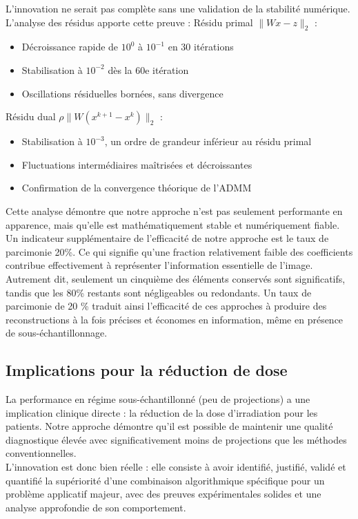 L'innovation ne serait pas complète sans une validation de la stabilité numérique. L'analyse des résidus apporte cette preuve :
Résidu primal $\|Wx - z\|_2$ :
\begin{itemize}[label=-]
\item Décroissance rapide de $10^0$ à $10^{-1}$ en 30 itérations
\item Stabilisation à $10^{-2}$ dès la 60e itération
\item Oscillations résiduelles bornées, sans divergence
\end{itemize}

Résidu dual $\rho \|W(x^{k+1} - x^k)\|_2$ :
\begin{itemize}[label=-]
\item Stabilisation à $10^{-3}$, un ordre de grandeur inférieur au résidu primal
\item Fluctuations intermédiaires maîtrisées et décroissantes
\item Confirmation de la convergence théorique de l'ADMM
\end{itemize}
Cette analyse démontre que notre approche n'est pas seulement performante en apparence, mais qu'elle est mathématiquement stable et numériquement fiable.\\
Un indicateur supplémentaire de l'efficacité de notre approche est le taux de parcimonie 20\%. Ce qui signifie qu'une fraction relativement faible des coefficients contribue effectivement à représenter l'information essentielle de l'image. Autrement dit, seulement un cinquième des éléments conservés sont significatifs, tandis que les 80\% restants sont négligeables ou redondants.
Un taux de parcimonie de 20 \% traduit ainsi l'efficacité de ces approches à produire des reconstructions à la fois précises et économes en information, même en présence de sous-échantillonnage.

\subsection{Implications pour la réduction de dose}
La performance en régime sous-échantillonné (peu de projections) a une implication clinique directe : la réduction de la dose d'irradiation pour les patients. Notre approche démontre qu'il est possible de maintenir une qualité diagnostique élevée avec significativement moins de projections que les méthodes conventionnelles.\\
L'innovation est donc bien réelle : elle consiste à avoir identifié, justifié, validé et quantifié la supériorité d'une combinaison algorithmique spécifique pour un problème applicatif majeur, avec des preuves expérimentales solides et une analyse approfondie de son comportement.

